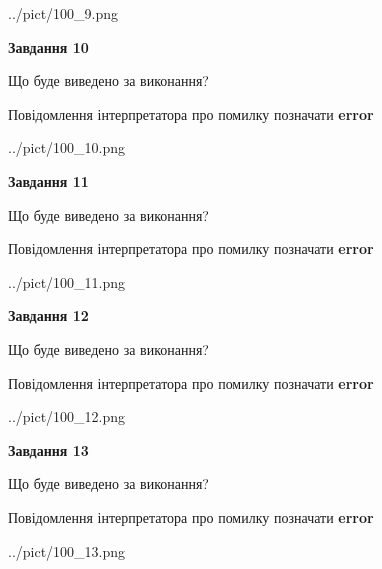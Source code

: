 \documentclass[11pt, ukrainian]{article}
\begin{document}
{\begin {large}
\begin{center}
	{../pict/100_9.png}
\end{center}
\newpage

{\begin {center}\textbf{Завдання 10}\end {center}}\par
Що буде виведено за виконання? \par
Повідомлення інтерпретатора про помилку позначати \textbf{error}

\begin{center}
	{../pict/100_10.png}
\end{center}
\newpage

{\begin {center}\textbf{Завдання 11}\end {center}}\par
Що буде виведено за виконання? \par
Повідомлення інтерпретатора про помилку позначати \textbf{error}

\begin{center}
	{../pict/100_11.png}
\end{center}
\newpage

{\begin {center}\textbf{Завдання 12}\end {center}}\par
Що буде виведено за виконання? \par
Повідомлення інтерпретатора про помилку позначати \textbf{error}

\begin{center}
	{../pict/100_12.png}
\end{center}
\newpage

{\begin {center}\textbf{Завдання 13}\end {center}}\par
Що буде виведено за виконання? \par
Повідомлення інтерпретатора про помилку позначати \textbf{error}

\begin{center}
	{../pict/100_13.png}
\end{center}
\newpage


\end{large}}
\end{document}
